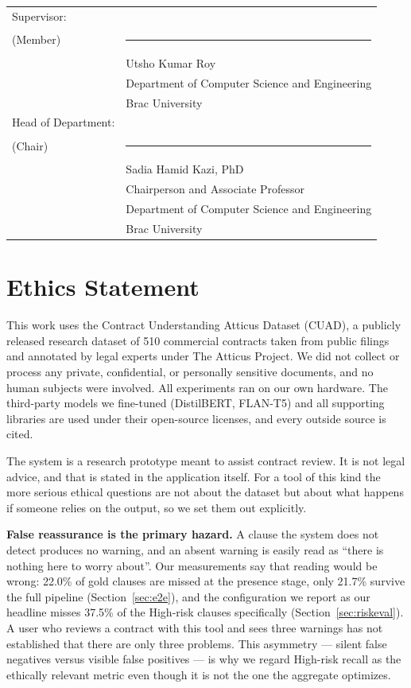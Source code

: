 \documentclass[12pt, a4paper, oneside]{report}
\newcommand{\frontchapter}[1]{%
  \chapter*{#1}\addcontentsline{toc}{chapter}{#1}}
\begin{document}
\begin{tabular}{p{4.2cm} p{9cm}}
Supervisor: & \\[0.1cm]
(Member) & \rule{6.5cm}{0.4pt}\\
 & Utsho Kumar Roy\\
 & Department of Computer Science and Engineering\\
 & Brac University\\[1.1cm]
Head of Department: & \\[0.1cm]
(Chair) & \rule{6.5cm}{0.4pt}\\
 & Sadia Hamid Kazi, PhD\\
 & Chairperson and Associate Professor\\
 & Department of Computer Science and Engineering\\
 & Brac University\\
\end{tabular}

\frontchapter{Ethics Statement}
This work uses the Contract Understanding Atticus Dataset (CUAD), a publicly released research dataset of 510 commercial contracts taken from public filings and annotated by legal experts under The Atticus Project. We did not collect or process any private, confidential, or personally sensitive documents, and no human subjects were involved. All experiments ran on our own hardware. The third-party models we fine-tuned (DistilBERT, FLAN-T5) and all supporting libraries are used under their open-source licenses, and every outside source is cited.

The system is a research prototype meant to assist contract review. It is not legal advice, and that is stated in the application itself. For a tool of this kind the more serious ethical questions are not about the dataset but about what happens if someone relies on the output, so we set them out explicitly.

\textbf{False reassurance is the primary hazard.} A clause the system does not detect produces no warning, and an absent warning is easily read as ``there is nothing here to worry about''. Our measurements say that reading would be wrong: 22.0\% of gold clauses are missed at the presence stage, only 21.7\% survive the full pipeline (Section~\ref{sec:e2e}), and the configuration we report as our headline misses 37.5\% of the High-risk clauses specifically (Section~\ref{sec:riskeval}). A user who reviews a contract with this tool and sees three warnings has not established that there are only three problems. This asymmetry --- silent false negatives versus visible false positives --- is why we regard High-risk recall as the ethically relevant metric even though it is not the one the aggregate optimizes.
\end{document}
